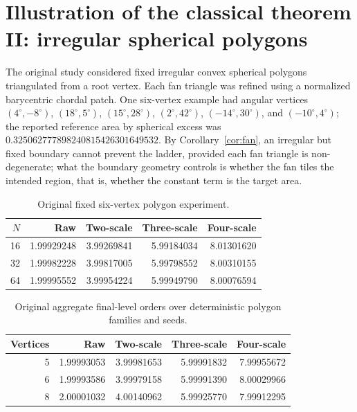 \documentclass[11pt]{article}
\theoremstyle{remark}
\begin{document}
\section{Illustration of the classical theorem II: irregular spherical polygons}\label{sec:polygon}
The original study considered fixed irregular convex spherical polygons triangulated from a
root vertex. Each fan triangle was refined using a normalized barycentric chordal patch. One
six-vertex example had angular vertices $(4^\circ,-8^\circ)$, $(18^\circ,5^\circ)$,
$(15^\circ,28^\circ)$, $(2^\circ,42^\circ)$, $(-14^\circ,30^\circ)$, and $(-10^\circ,4^\circ)$;
the reported reference area by spherical excess was
$0.325062777898240815426301649532$. By Corollary~\ref{cor:fan}, an irregular but fixed
boundary cannot prevent the ladder, provided each fan triangle is non-degenerate; what the
boundary geometry controls is whether the fan tiles the intended region, that is, whether the
constant term is the target area.

\begin{table}[ht]
\centering
\begin{tabular}{rrrrr}
\toprule
$N$ & Raw & Two-scale & Three-scale & Four-scale\\
\midrule
16 & 1.99929248 & 3.99269841 & 5.99184034 & 8.01301620\\
32 & 1.99982228 & 3.99817005 & 5.99798552 & 8.00310155\\
64 & 1.99995552 & 3.99954224 & 5.99949790 & 8.00076594\\
\bottomrule
\end{tabular}
\caption{Original fixed six-vertex polygon experiment.}\label{tab:poly6}
\end{table}

\begin{table}[ht]
\centering
\begin{tabular}{rrrrr}
\toprule
Vertices & Raw & Two-scale & Three-scale & Four-scale\\
\midrule
5 & 1.99993053 & 3.99981653 & 5.99991832 & 7.99955672\\
6 & 1.99993586 & 3.99979158 & 5.99991390 & 8.00029966\\
8 & 2.00001032 & 4.00140962 & 5.99925770 & 7.99912295\\
\bottomrule
\end{tabular}
\caption{Original aggregate final-level orders over deterministic polygon families and
seeds.}\label{tab:polybatch}
\end{table}
\end{document}

